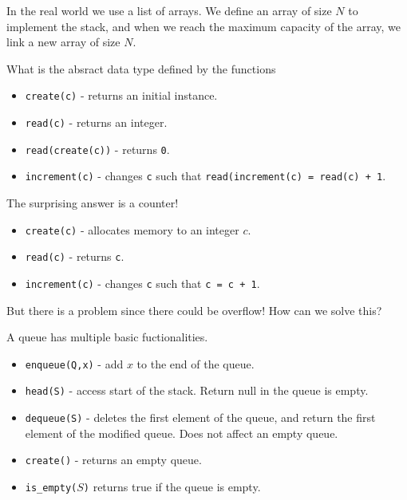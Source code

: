 \documentclass[11pt,a4paper]{article}
\begin{document}
In the real world we use a list of arrays.
We define an array of size $N$ to implement the stack, and when
we reach the maximum capacity of the array, we link
a new array of size $N$.

\begin{exercise}
    What is the absract data type defined by the functions
    \begin{itemize}
        \item \texttt{create(c)} - returns an initial instance.
        \item \texttt{read(c)} - returns an integer.
        \item \texttt{read(create(c))} - returns \texttt 0.
        \item \texttt{increment(c)} - changes \texttt c such that 
            \texttt{read(increment(c) = read(c) + 1}.
    \end{itemize}
\end{exercise}

The surprising answer is a counter!
\begin{itemize}
    \item \texttt{create(c)} - allocates memory to an integer $c$.
    \item \texttt{read(c)} - returns \texttt c.
    \item \texttt{increment(c)} - changes \texttt c such that 
        \texttt{c = c + 1}.
\end{itemize}

But there is a problem since there could be overflow!
How can we solve this?

\begin{example}[Queue]
    A queue has multiple basic fuctionalities.
    \begin{itemize}
        \item \texttt{enqueue(Q,x)} - add $x$ to the end of the queue.
        \item \texttt{head(S)} - access start of the stack. Return null
            in the queue is empty.
        \item \texttt{dequeue(S)} - deletes the first element of the queue,
            and return the first element of the modified queue.
            Does not affect an empty queue.
        \item \texttt{create()} - returns an empty queue.
        \item \texttt{is\_empty($S$)} returns true if the queue is empty.
    \end{itemize}
\end{example}
\end{document}
